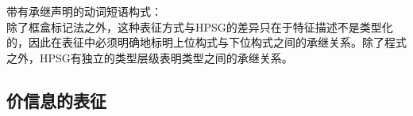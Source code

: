 \ea
带有承继声明的动词短语构式：\\
\setlength{\fboxsep}{2mm}
\z
除了框盒标记法之外，这种表征方式与HPSG的差异只在于特征描述不是类型化的，因此在表征中必须明确地标明上位构式与下位构式之间的承继关系。除了程式之外，HPSG有独立的类型层级表明类型之间的承继关系。

\subsection{价信息的表征}


